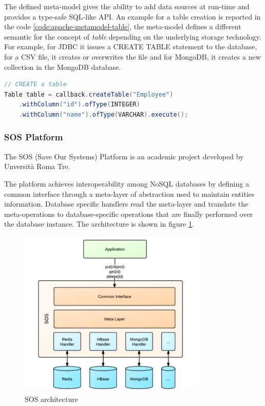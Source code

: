 \noindent The defined meta-model gives the ability to add data sources at run-time and provides a type-safe SQL-like API. An example for a table creation is reported in the code \ref{code:apache-metamodel-table}, the meta-model defines a different semantic for the concept of \textit{table} depending on the underlying storage technology. For example, for JDBC it issues a CREATE TABLE statement to the database, for a CSV file, it creates or overwrites the file and for MongoDB, it creates a new collection in the MongoDB database.

\begin{lstlisting}[language=Java, caption=Apache MetaModel example, label=code:apache-metamodel-table]
// CREATE a table
Table table = callback.createTable("Employee")
    .withColumn("id").ofType(INTEGER)
    .withColumn("name").ofType(VARCHAR).execute();
\end{lstlisting}
            
\subsubsection{SOS Platform}
The SOS (Save Our Systems) Platform \cite{paper:sos-platform} is an academic project developed by Unversit\`{a} Roma Tre.

\noindent The platform achieves interoperability among NoSQL databases by defining a common interface through a meta-layer of abstraction used to maintain entities information. Database specific handlers read the meta-layer and translate the meta-operations to database-specific operations that are finally performed over the database instance.
The architecture is shown in figure \ref{fig:sos-architecture}.

\begin{figure}[tbh]
  \centering
  \includegraphics[width=9cm]{images/sos_architecture}
  \caption{SOS architecture \cite{paper:sos-platform}}
  \label{fig:sos-architecture}
\end{figure}

